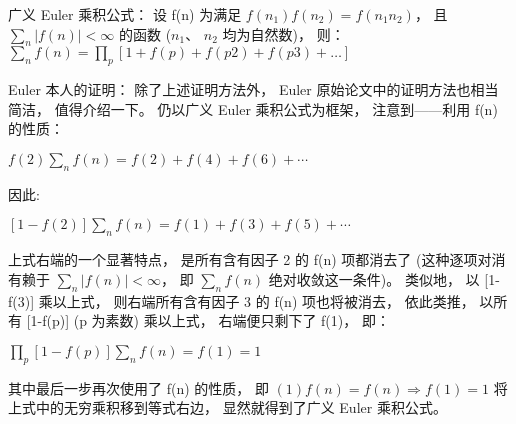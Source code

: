 \documentclass[a4paper]{article}
\begin{document}
广义 Euler 乘积公式： 设 f(n) 为满足 $f(n_1)f(n_2) = f(n_1n_2)$， 且$ \sum_n|f(n)| < ∞ $ 的函数 ($n_1$、 $n_2$ 均为自然数)， 则：
$\sum_n f(n) = \prod_p [1+f(p)+f(p2)+f(p3)+ \ldots]$

Euler 本人的证明： 除了上述证明方法外， Euler 原始论文中的证明方法也相当简洁， 值得介绍一下。 仍以广义 Euler 乘积公式为框架， 注意到——利用 f(n) 的性质：

$f(2)\sum_n f(n) = f(2)+f(4)+f(6)+ \cdots$

因此:

$[1-f(2)]\sum_n f(n) = f(1)+f(3)+f(5)+ \cdots$

上式右端的一个显著特点， 是所有含有因子 2 的 f(n) 项都消去了 (这种逐项对消有赖于 $\sum_n |f(n)| < ∞$， 即 $\sum_n f(n)$ 绝对收敛这一条件)。 类似地， 以 [1-f(3)] 乘以上式， 则右端所有含有因子 3 的 f(n) 项也将被消去， 依此类推， 以所有 [1-f(p)] (p 为素数) 乘以上式， 右端便只剩下了 f(1)， 即：

$\prod_p [1-f(p)]\sum_n f(n) = f(1) = 1$

其中最后一步再次使用了 f(n) 的性质， 即 $(1)f(n)=f(n) ⇒ f(1)=1$ 将上式中的无穷乘积移到等式右边， 显然就得到了广义 Euler 乘积公式。
\end{document}
